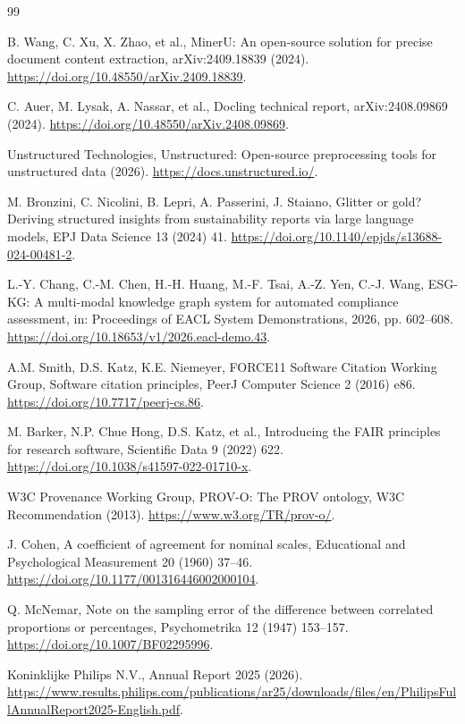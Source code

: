 \documentclass[a4paper,fleqn]{cas-sc}
\begin{document}
\begin{thebibliography}{99}

B. Wang, C. Xu, X. Zhao, et al.,
MinerU: An open-source solution for precise document content extraction,
arXiv:2409.18839 (2024).
\newblock \url{https://doi.org/10.48550/arXiv.2409.18839}.

C. Auer, M. Lysak, A. Nassar, et al.,
Docling technical report,
arXiv:2408.09869 (2024).
\newblock \url{https://doi.org/10.48550/arXiv.2408.09869}.

Unstructured Technologies,
Unstructured: Open-source preprocessing tools for unstructured data (2026).
\newblock \url{https://docs.unstructured.io/}.

M. Bronzini, C. Nicolini, B. Lepri, A. Passerini, J. Staiano,
Glitter or gold? Deriving structured insights from sustainability reports via large language models,
EPJ Data Science 13 (2024) 41.
\newblock \url{https://doi.org/10.1140/epjds/s13688-024-00481-2}.

L.-Y. Chang, C.-M. Chen, H.-H. Huang, M.-F. Tsai, A.-Z. Yen, C.-J. Wang,
ESG-KG: A multi-modal knowledge graph system for automated compliance assessment,
in: Proceedings of EACL System Demonstrations, 2026, pp. 602--608.
\newblock \url{https://doi.org/10.18653/v1/2026.eacl-demo.43}.

A.M. Smith, D.S. Katz, K.E. Niemeyer, FORCE11 Software Citation Working Group,
Software citation principles,
PeerJ Computer Science 2 (2016) e86.
\newblock \url{https://doi.org/10.7717/peerj-cs.86}.

M. Barker, N.P. Chue Hong, D.S. Katz, et al.,
Introducing the FAIR principles for research software,
Scientific Data 9 (2022) 622.
\newblock \url{https://doi.org/10.1038/s41597-022-01710-x}.

W3C Provenance Working Group,
PROV-O: The PROV ontology, W3C Recommendation (2013).
\newblock \url{https://www.w3.org/TR/prov-o/}.

J. Cohen,
A coefficient of agreement for nominal scales,
Educational and Psychological Measurement 20 (1960) 37--46.
\newblock \url{https://doi.org/10.1177/001316446002000104}.

Q. McNemar,
Note on the sampling error of the difference between correlated proportions or percentages,
Psychometrika 12 (1947) 153--157.
\newblock \url{https://doi.org/10.1007/BF02295996}.

Koninklijke Philips N.V.,
Annual Report 2025 (2026).
\newblock \url{https://www.results.philips.com/publications/ar25/downloads/files/en/PhilipsFullAnnualReport2025-English.pdf}.

\end{thebibliography}
\end{document}
